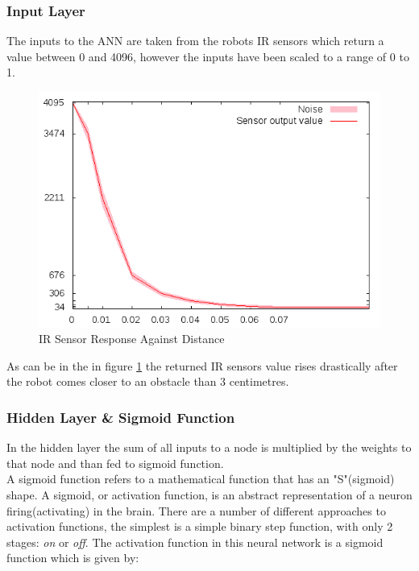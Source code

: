 \subsubsection{Input Layer}
The inputs to the ANN are taken from the robots IR sensors which return a value between 0 and 4096, however the inputs have been scaled to a range of 0 to 1.

\begin{figure}[h]
\begin{center}
\includegraphics[scale=0.3]{Chapter2/images/Selection_002.png} 
\caption[IR Sensor Response Against Distance]{IR Sensor Response Against Distance\footnotemark}
\label{fig:ir_distance}
\end{center}
\end{figure} 


As can be in the in figure \ref{fig:ir_distance} the returned IR sensors value rises drastically after the robot comes closer to an obstacle than 3 centimetres. 


\subsubsection{Hidden Layer \& Sigmoid Function}\label{sec:hiddenlayer}
In the hidden layer the sum of all inputs to a node is multiplied by the weights to that node and than fed to sigmoid function.\\

A sigmoid function refers to a mathematical function that has an "S"(sigmoid) shape.
A sigmoid, or activation function, is an abstract representation of a neuron firing(activating) in the brain. There are a number of different approaches to activation functions, the simplest is a simple binary step function, with only 2 stages: \textit{on} or \textit{off}.
The activation function in this neural network is a sigmoid function which is given by:

